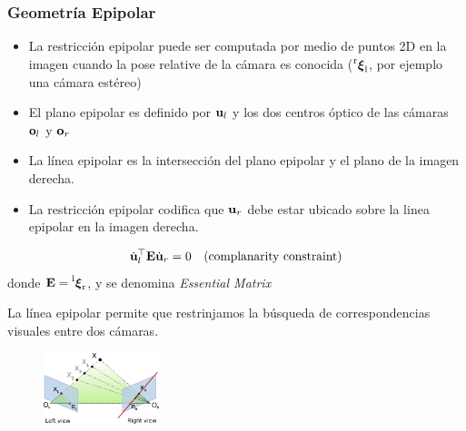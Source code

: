 \begin{frame}
	\frametitle{Geometría Epipolar}
	\footnotesize
	
	\begin{itemize}
		\item La restricción epipolar puede ser computada por medio de puntos 2D en la imagen cuando la pose relative de la cámara es conocida ($\prescript{\mathrm{r}}{}{{\boldsymbol{\mathbf{\xi}}}_\mathrm{l}}$, por ejemplo una cámara estéreo)
		\item El plano epipolar es definido por $\boldsymbol{\mathbf{u}}_{l}$ y los dos centros óptico de las cámaras $\boldsymbol{\mathbf{o}}_{l}$ y $\boldsymbol{\mathbf{o}}_{r}$
		\item La línea epipolar es la intersección del plano epipolar y el plano de la imagen derecha.
		\item La restricción epipolar codifica que $\boldsymbol{\mathbf{u}}_{r}$ debe estar ubicado sobre la linea epipolar en la imagen derecha.
	\end{itemize}

	\begin{equation*}
		\dot{\boldsymbol{\mathbf{u}}}_{l}^{\top} \boldsymbol{\mathbf{E}} \dot{\boldsymbol{\mathbf{u}}}_{r} = 0 \quad \text{(complanarity constraint)}
	\end{equation*}
	donde $\boldsymbol{\mathbf{E}} = \prescript{\mathrm{l}}{}{{\boldsymbol{\mathbf{\xi}}}_\mathrm{r}}$, y se denomina \emph{Essential Matrix}
	
	La línea epipolar permite que restrinjamos la búsqueda de correspondencias visuales entre dos cámaras.
	
	
	\begin{figure}
		\includegraphics[width=0.3\textwidth]{./images/epipolar_geometry.pdf}
	\end{figure}
	
\end{frame}

